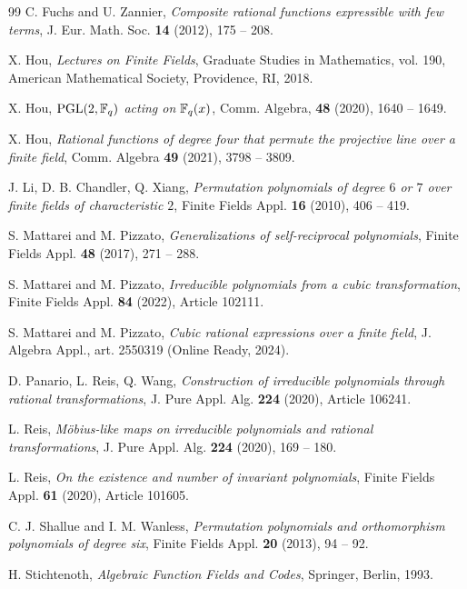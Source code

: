 \documentclass{amsart}
\numberwithin{equation}{section}
\theoremstyle{definition}
\begin{document}
\begin{thebibliography}{99}
C. Fuchs and U. Zannier, 
{\it Composite rational functions expressible with few terms},
J. Eur. Math. Soc. {\bf 14} (2012), 175 -- 208.

X. Hou, {\it Lectures on Finite Fields}, Graduate Studies in Mathematics, vol. 190, American Mathematical Society, Providence, RI, 2018.

X. Hou, {\it $\text{\rm PGL}(2,\Bbb F_q)$ acting on $\Bbb F_q(x)$}, Comm. Algebra, {\bf 48} (2020), 1640 -- 1649.

X. Hou, {\it Rational functions of degree four that permute the projective line over a finite field}, Comm. Algebra {\bf 49} (2021), 3798 -- 3809.

J. Li, D. B. Chandler, Q. Xiang, {\it Permutation polynomials of degree $6$ or $7$ over finite fields of characteristic $2$}, Finite Fields Appl. {\bf 16} (2010), 406 -- 419.


S. Mattarei and M. Pizzato, {\it Generalizations of self-reciprocal polynomials}, Finite Fields Appl. {\bf 48} (2017), 271 -- 288.

S. Mattarei and M. Pizzato, {\it Irreducible polynomials from a cubic transformation}, Finite Fields Appl. {\bf 84} (2022), Article 102111.

S. Mattarei and M. Pizzato, {\it Cubic rational expressions over a finite field}, J. Algebra Appl., art. 2550319 (Online Ready, 2024). %

D. Panario, L. Reis, Q. Wang, {\it Construction of irreducible
polynomials through rational transformations}, J. Pure Appl. Alg. {\bf 224} (2020),  Article 106241.

L. Reis, {\it M\"obius-like maps on irreducible polynomials and rational
transformations}, J. Pure Appl. Alg. {\bf 224} (2020), 169 -- 180.

L. Reis, {\it On the existence and number of invariant polynomials}, Finite Fields Appl. {\bf 61} (2020), Article 101605. 

C. J. Shallue and I. M. Wanless, {\it Permutation polynomials and orthomorphism polynomials of degree six}, Finite Fields Appl. {\bf 20} (2013), 94 -- 92.

H. Stichtenoth, {\it Algebraic Function Fields and Codes},  Springer, Berlin, 1993.


\end{thebibliography}
\end{document}
